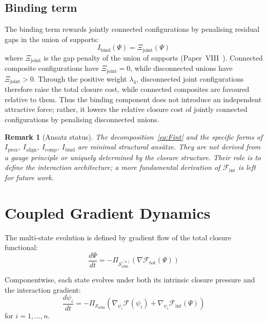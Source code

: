 \documentclass[12pt]{article}
\newtheorem{remark}[theorem]{Remark}
\newcommand{\Fcal}{\mathcal{F}}
\newcommand{\Sadm}{\mathcal{S}_{\mathrm{adm}}}
\newcommand{\Fint}{\Fcal_{\mathrm{int}}}
\newcommand{\Ftot}{\Fcal_{\mathrm{tot}}}
\begin{document}
\subsection{Binding term}

The binding term rewards jointly connected configurations by penalising residual gaps in the union of supports:
\begin{equation}\label{eq:bind}
    I_{\mathrm{bind}}(\Psi) = \Xi_{\mathrm{joint}}(\Psi)
\end{equation}
where $\Xi_{\mathrm{joint}}$ is the gap penalty of the union of supports (Paper~VIII~\citep{SmartVIII}). Connected composite configurations have $\Xi_{\mathrm{joint}} = 0$, while disconnected unions have $\Xi_{\mathrm{joint}} > 0$. Through the positive weight $\lambda_4$, disconnected joint configurations therefore raise the total closure cost, while connected composites are favoured relative to them. Thus the binding component does not introduce an independent attractive force; rather, it lowers the relative closure cost of jointly connected configurations by penalising disconnected unions.

\begin{remark}[Ansatz status]
The decomposition~\eqref{eq:Fint} and the specific forms of $I_{\mathrm{prox}}$, $I_{\mathrm{align}}$, $I_{\mathrm{comp}}$, $I_{\mathrm{bind}}$ are minimal structural ansätze. They are not derived from a gauge principle or uniquely determined by the closure structure. Their role is to define the interaction architecture; a more fundamental derivation of $\Fint$ is left for future work.
\end{remark}

\section{Coupled Gradient Dynamics}\label{sec:coupled}

The multi-state evolution is defined by gradient flow of the total closure functional:
\begin{equation}\label{eq:coupledflow}
    \frac{d\Psi}{dt} = -\Pi_{\Sadm^{(n)}}\!\left(\nabla\Ftot(\Psi)\right)
\end{equation}

Componentwise, each state evolves under both its intrinsic closure pressure and the interaction gradient:
\begin{equation}\label{eq:componentflow}
    \frac{d\psi_i}{dt} = -\Pi_{\Sadm}\!\left(\nabla_{\psi_i}\Fcal(\psi_i) + \nabla_{\psi_i}\Fint(\Psi)\right)
\end{equation}
for $i = 1, \ldots, n$.
\end{document}
